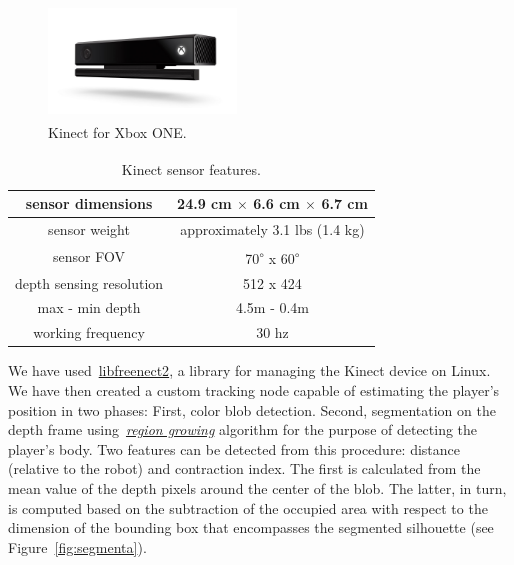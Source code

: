 \begin{figure}[H]
	\centering
	\includegraphics[width=5cm]{images/03-foundation/kinect}
	\caption{Kinect\textsuperscript{\textregistered} for Xbox ONE.}
	\label{kinect} 
\end{figure}

\begin{table}[H]
\begin{center}
	\begin{tabular}{|c|c|}
		\hline
		sensor dimensions & 24.9 cm $\times$ 6.6 cm $\times$ 6.7 cm\\
		\hline
		sensor weight & approximately 3.1 lbs (1.4 kg) \\
		\hline
		sensor FOV & 70\textsuperscript{$\circ$} x 60\textsuperscript{$\circ$} \\
		\hline
		depth sensing resolution & 512 x 424 \\
		\hline
		max - min depth & 4.5m - 0.4m \\ 
		\hline
		working frequency & 30 hz \\
		\hline 
	\end{tabular}
\end{center}
\caption{Kinect\textsuperscript{\textregistered} sensor features.}
\label{kinectfeatures}
\end{table}

We have used~\href{https://github.com/OpenKinect/libfreenect2}{libfreenect2}, a library for managing the Kinect device on Linux. We have then created a custom tracking node capable of estimating the player's position in two phases: First, color blob detection. Second, segmentation on the depth frame using~\href{https://en.wikipedia.org/wiki/Region_growing}{\textit{region growing}} algorithm for the purpose of detecting the player's body. Two features can be detected from this procedure: distance (relative to the robot) and contraction index. The first is calculated from the mean value of the depth pixels around the center of the blob. The latter, in turn, is computed based on the subtraction of the occupied area with respect to the dimension of the bounding box that encompasses the segmented silhouette (see Figure~\ref{fig:segmenta}).

